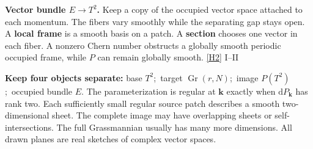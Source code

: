 \documentclass[11pt,a4paper]{article}
\newcommand{\Gr}{\operatorname{Gr}}
\newcommand{\dd}{\mathrm d}
\newcommand{\srctext}[2]{\textcolor{KnownBlue}{\scriptsize\sffamily\hyperlink{ref:#1}{[#1]} #2}}
\newcommand{\src}[2]{\ifmmode\text{\srctext{#1}{#2}}\else\srctext{#1}{#2}\fi}
\begin{document}
\textbf{Vector bundle $E\to T^2$.} Keep a copy of the occupied vector space
attached to each momentum. The fibers vary smoothly while the separating
gap stays open. A \textbf{local frame} is a smooth basis on a patch.
A \textbf{section} chooses one vector in each fiber.
A nonzero Chern number obstructs a globally smooth periodic occupied frame,
while $P$ can remain globally smooth.
\src{H2}{I--II}
\begin{plainbox}
\textbf{Keep four objects separate:}\quad
base $T^2$;\ target $\Gr(r,N)$;\ image $P(T^2)$;\ occupied bundle $E$.
The parameterization is regular at $\mathbf k$ exactly when $\dd P_{\mathbf k}$
has rank two. Each sufficiently small regular source patch describes a smooth
two-dimensional sheet. The complete image may have overlapping sheets or
self-intersections.
The full Grassmannian usually has many more dimensions.
All drawn planes are real sketches of complex vector spaces.
\end{plainbox}
\end{document}
